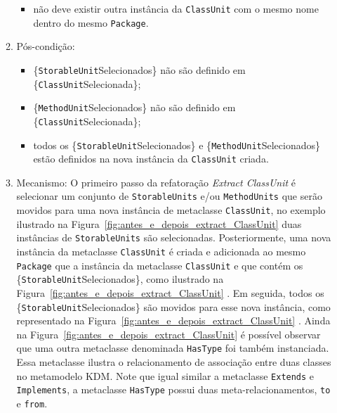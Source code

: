 \begin{enumerate}
\begin{enumerate}
\begin{itemize}
			        \item não deve existir outra instância da \texttt{ClassUnit} com o mesmo nome dentro do mesmo \texttt{Package}.
			    \end{itemize}
			\item Pós-condição:
			    \begin{itemize}
			        \item \{\texttt{StorableUnit}Selecionados\} não são definido em \{\texttt{ClassUnit}Selecionada\};
			        \item \{\texttt{MethodUnit}Selecionados\} não são definido em \{\texttt{ClassUnit}Selecionada\};
			        \item todos os \{\texttt{StorableUnit}Selecionados\} e \{\texttt{MethodUnit}Selecionados\} estão definidos na nova instância da \texttt{ClassUnit} criada.
			    \end{itemize}
			\item Mecanismo: O primeiro passo da refatoração \textit{Extract ClassUnit} é selecionar um conjunto de \texttt{StorableUnits} e/ou \texttt{MethodUnits} que serão movidos para uma nova instância de metaclasse \texttt{ClassUnit}, no exemplo ilustrado na Figura~\ref{fig:antes_e_depois_extract_ClassUnit}  duas instâncias de \texttt{StorableUnits} são selecionadas. Posteriormente, uma nova instância da metaclasse \texttt{ClassUnit} é criada e adicionada ao mesmo \texttt{Package} que a instância da metaclasse \texttt{ClassUnit} e que contém os \{\texttt{StorableUnit}Selecionados\}, como ilustrado na Figura~\ref{fig:antes_e_depois_extract_ClassUnit} . Em seguida, todos os \{\texttt{StorableUnit}Selecionados\} são movidos para esse nova instância, como representado na Figura~\ref{fig:antes_e_depois_extract_ClassUnit} . Ainda na Figura~\ref{fig:antes_e_depois_extract_ClassUnit}  é possível observar que uma outra metaclasse denominada \texttt{HasType} foi também instanciada. Essa metaclasse ilustra o relacionamento de associação entre duas classes no metamodelo KDM. Note que igual similar a metaclasse \texttt{Extends} e \texttt{Implements}, a metaclasse \texttt{HasType} possui duas meta-relacionamentos, \texttt{to} e \texttt{from}.
\begin{minipage}{.90\textwidth}
	\vspace*{\fill}
  \centering

\end{minipage}
\end{enumerate}
\end{enumerate}
